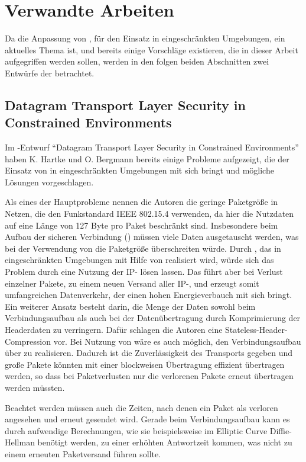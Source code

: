 \section{Verwandte Arbeiten}

Da die Anpassung von , für den Einsatz in eingeschränkten Umgebungen, ein aktuelles Thema ist, und bereits einige Vorschläge
existieren, die in dieser Arbeit aufgegriffen werden sollen, werden in den folgen beiden Abschnitten zwei Entwürfe der  betrachtet.

\subsection{Datagram Transport Layer Security in Constrained Environments}
Im -Entwurf "`Datagram Transport Layer Security in Constrained Environments"' \cite{draftcodtls} haben K. Hartke und O. Bergmann
bereits einige Probleme aufgezeigt, die der Einsatz von  in eingeschränkten Umgebungen mit sich bringt und mögliche Lösungen vorgeschlagen.

Als eines der Hauptprobleme nennen die Autoren die geringe Paketgröße in Netzen, die den Funkstandard IEEE 802.15.4 \cite{ieee802154} verwenden,
da hier die Nutzdaten auf eine Länge von 127 Byte pro Paket beschränkt sind. Insbesondere beim Aufbau der sicheren Verbindung () müssen
viele Daten ausgetauscht werden, was bei der Verwendung von  die Paketgröße überschreiten würde. Durch  \cite{rfc2460}, das in
eingeschränkten Umgebungen mit Hilfe von  \cite{rfc4944} realisiert wird, würde sich das Problem durch eine Nutzung der IP-
lösen lassen. Das führt aber bei Verlust einzelner Pakete, zu einem neuen Versand aller IP-, und erzeugt somit umfangreichen Datenverkehr,
der einen hohen Energieverbauch mit sich bringt. Ein weiterer Ansatz besteht darin, die Menge der Daten sowohl beim Verbindungsaufbau als auch bei der
Datenübertragung durch Komprimierung der Headerdaten zu verringern. Dafür schlagen die Autoren eine Stateless-Header-Compression vor. Bei Nutzung von
 wäre es auch möglich, den Verbindungsaufbau über  zu realisieren. Dadurch ist die Zuverlässigkeit des Transports gegeben und große Pakete
könnten mit einer blockweisen Übertragung effizient übertragen werden, so dass bei Paketverlusten nur die verlorenen Pakete erneut übertragen werden müssten.

Beachtet werden müssen auch die Zeiten, nach denen ein Paket als verloren angesehen und erneut gesendet wird. Gerade beim Verbindungsaufbau
kann es durch aufwendige Berechnungen, wie sie beispielsweise im Elliptic Curve Diffie-Hellman benötigt werden, zu einer erhöhten
Antwortzeit kommen, was nicht zu einem erneuten Paketversand führen sollte.

